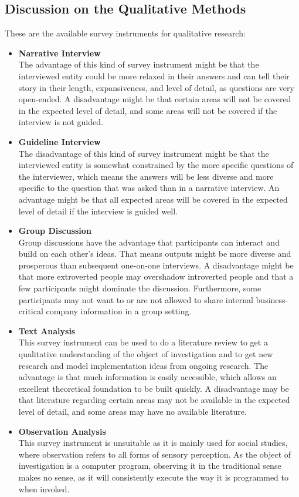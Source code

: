 \documentclass[draft,final]{thesisclass} %
\begin{document}
\subsection{Discussion on the Qualitative Methods}
These are the available survey instruments for qualitative research:
\begin{itemize}
    \item \textbf{Narrative Interview}\\
    The advantage of this kind of survey instrument might be that the interviewed entity could be more relaxed in their answers and can tell their story in their length, expansiveness, and level of detail, as questions are very open-ended.
    A disadvantage might be that certain areas will not be covered in the expected level of detail, and some areas will not be covered if the interview is not guided.
    \item \textbf{Guideline Interview}\\
    The disadvantage of this kind of survey instrument might be that the interviewed entity is somewhat constrained by the more specific questions of the interviewer, which means the answers will be less diverse and more specific to the question that was asked than in a narrative interview.
    An advantage might be that all expected areas will be covered in the expected level of detail if the interview is guided well.
    \item \textbf{Group Discussion}\\
    Group discussions have the advantage that participants can interact and build on each other's ideas. 
    That means outputs might be more diverse and prosperous than subsequent one-on-one interviews.
    A disadvantage might be that more extroverted people may overshadow introverted people and that a few participants might dominate the discussion.
    Furthermore, some participants may not want to or are not allowed to share internal business-critical company information in a group setting.
    \item \textbf{Text Analysis}\\
    This survey instrument can be used to do a literature review to get a qualitative understanding of the object of investigation and to get new research and model implementation ideas from ongoing research.
    The advantage is that much information is easily accessible, which allows an excellent theoretical foundation to be built quickly.
    A disadvantage may be that literature regarding certain areas may not be available in the expected level of detail, and some areas may have no available literature.
    \item \textbf{Observation Analysis}\\
    This survey instrument is unsuitable as it is mainly used for social studies, where observation refers to all forms of sensory perception.
    As the object of investigation is a computer program, observing it in the traditional sense makes no sense, as it will consistently execute the way it is programmed to when invoked.
\end{itemize}
\end{document}
